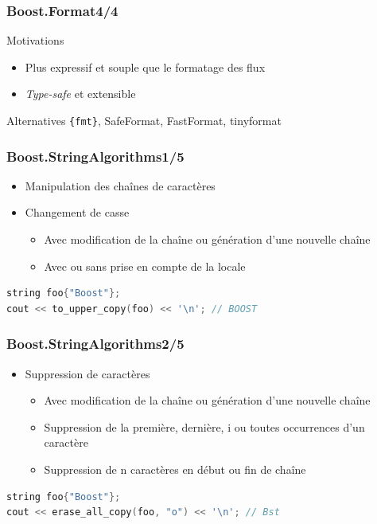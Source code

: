 \documentclass[C++.tex]{subfiles}
\begin{document}
\begin{frame}[fragile]
	\frametitle{Boost.Format\titlehfill{}4/4}
	\begin{block}{Motivations}
		\begin{itemize}
			\item Plus expressif et souple que le formatage des flux
			\item \textit{Type-safe} et extensible
		\end{itemize}
	\end{block}

	\begin{block}{Alternatives}
		\lstinline|{fmt}|, SafeFormat, FastFormat,  tinyformat

	\end{block}
\end{frame}

\begin{frame}[fragile]
	\frametitle{Boost.StringAlgorithms\titlehfill{}1/5}
	\begin{itemize}
		\item Manipulation des chaînes de caractères
		\item Changement de casse
		\begin{itemize}
			\item Avec modification de la chaîne ou génération d'une nouvelle chaîne
			\item Avec ou sans prise en compte de la locale
		\end{itemize}
	\end{itemize}

	\begin{lstlisting}[language=C++]
string foo{"Boost"};
cout << to_upper_copy(foo) << '\n'; // BOOST\end{lstlisting}
\end{frame}

\begin{frame}[fragile]
	\frametitle{Boost.StringAlgorithms\titlehfill{}2/5}
	\begin{itemize}
		\item Suppression de caractères
		\begin{itemize}
			\item Avec modification de la chaîne ou génération d'une nouvelle chaîne
			\item Suppression de la première, dernière, i\ieme{} ou toutes occurrences d'un caractère
			\item Suppression de n caractères en début ou fin de chaîne
		\end{itemize}
	\end{itemize}

	\begin{lstlisting}[language=C++]
string foo{"Boost"};
cout << erase_all_copy(foo, "o") << '\n'; // Bst\end{lstlisting}
\end{frame}
\end{document}
